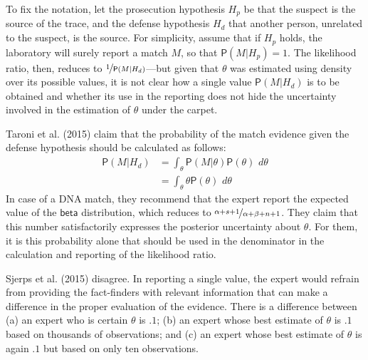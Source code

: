 \documentclass[
  10pt,
  dvipsnames,enabledeprecatedfontcommands]{scrartcl}
\newcommand{\pr}[1]{\mathsf{P}(#1)}
\newcommand{\s}[1]{\mbox{$\mathsf{#1}$}}
\begin{document}
To fix the notation, let the prosecution hypothesis \(H_p\) be that the
suspect is the source of the trace, and the defense hypothesis \(H_d\)
that another person, unrelated to the suspect, is the source. For
simplicity, assume that if \(H_p\) holds, the laboratory will surely
report a match \(M\), so that \(\pr{M\vert H_p}=1\). The likelihood
ratio, then, reduces to \(\nicefrac{1}{\pr{M \vert H_d}}\)---but given
that \(\theta\) was estimated using density over its possible values, it
is not clear how a single value \(\pr{M \vert H_d}\) is to be obtained
and whether its use in the reporting does not hide the uncertainty
involved in the estimation of \(\theta\) under the carpet.

Taroni et al. (2015) claim that the probability of the match evidence
given the defense hypothesis should be calculated as follows:
\begin{align*}\pr{M \vert H_d} & = \int_{\theta} \pr{M\vert \theta} \pr{\theta}\,\, d\theta \\
& =  \int_\theta  \theta \pr{\theta}\,\, d\theta
\end{align*} In case of a DNA match, they recommend that the expert
report the expected value of the \(\s{beta}\) distribution, which
reduces to \(\nicefrac{\alpha + s + 1}{\alpha + \beta +n + 1}\). They
claim that this number satisfactorily expresses the posterior
uncertainty about \(\theta\). For them, it is this probability alone
that should be used in the denominator in the calculation and reporting
of the likelihood ratio.

Sjerps et al. (2015) disagree. In reporting a single value, the expert
would refrain from providing the fact-finders with relevant information
that can make a difference in the proper evaluation of the evidence.
There is a difference between (a) an expert who is certain \(\theta\) is
\(.1\); (b) an expert whose best estimate of \(\theta\) is \(.1\) based
on thousands of observations; and (c) an expert whose best estimate of
\(\theta\) is again \(.1\) but based on only ten observations.
\end{document}

